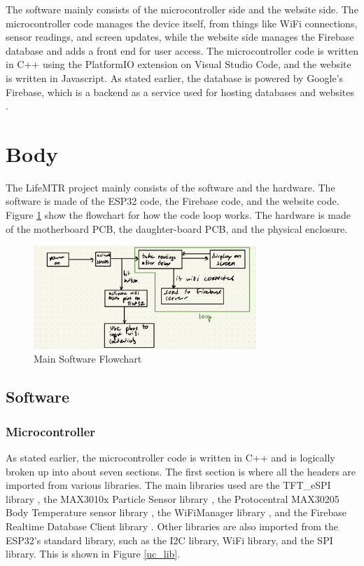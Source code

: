 \documentclass[12pt]{article}
\begin{document}
    The software mainly consists of the microcontroller side and the website side. The microcontroller code manages the device itself, from things like WiFi connections, sensor readings, and screen updates, while the website side manages the Firebase database and adds a front end for user access. The microcontroller code is written in C++ using the PlatformIO extension on Visual Studio Code, and the website is written in Javascript. As stated earlier, the database is powered by Google's Firebase, which is a backend as a service used for hosting databases and websites \cite{firebase}.

\newpage
\section{Body}
    The LifeMTR project mainly consists of the software and the hardware. The software is made of the ESP32 code, the Firebase code, and the website code. Figure \ref{fc} show the flowchart for how the code loop works. The hardware is made of the motherboard PCB, the daughter-board PCB, and the physical enclosure.
    \begin{figure}[h]
        \centering
        \includegraphics[width=0.75\textwidth]{flowchart}
        \caption{Main Software Flowchart}
        \label{fc}
    \end{figure} 

\subsection{Software}
\subsubsection{Microcontroller}
    As stated earlier, the microcontroller code is written in C++ and is logically broken up into about seven sections. The first section is where all the headers are imported from various libraries. The main libraries used are the TFT\_eSPI library \cite{tft_espi}, the MAX3010x Particle Sensor library \cite{sparkfun_max301x}, the Protocentral MAX30205 Body Temperature sensor library \cite{protocentral_max30205}, the WiFiManager library \cite{wifi_manager}, and the Firebase Realtime Database Client library \cite{firebase_client_lib}. Other libraries are also imported from the ESP32's standard library, such as the I2C library, WiFi library, and the SPI library. This is shown in Figure \ref{uc_lib}.
\end{document}
